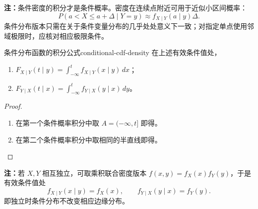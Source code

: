 \textbf{注：}\quad 条件密度的积分才是条件概率。密度在连续点附近可用于近似小区间概率：
\[
P(a<X\leq a+\Delta\mid Y=y)\approx f_{X\mid Y}(a\mid y)\Delta.
\]
条件分布版本只需在关于条件变量分布的几乎处处意义下一致；对指定单点使用邻域极限时，应核对相应极限条件。

\begin{mycorollary}{条件分布函数的积分公式}{conditional-cdf-density}
在上述有效条件值处，
\begin{enumerate}
\item $F_{X\mid Y}(t\mid y)=\displaystyle\int_{-\infty}^t
f_{X\mid Y}(x\mid y)\,dx$；
\item $F_{Y\mid X}(t\mid x)=\displaystyle\int_{-\infty}^t
f_{Y\mid X}(y\mid x)\,dy$。
\end{enumerate}
\end{mycorollary}
\begin{proof}
\begin{enumerate}
\item 在第一个条件概率积分中取 $A=(-\infty,t]$ 即得。
\item 在第二个条件概率积分中取相同的半直线即得。
\end{enumerate}
\end{proof}

\textbf{注：}\quad 若 $X,Y$ 相互独立，可取乘积联合密度版本 $f(x,y)=f_X(x)f_Y(y)$，于是有效条件值处
\[
f_{X\mid Y}(x\mid y)=f_X(x),\qquad
f_{Y\mid X}(y\mid x)=f_Y(y).
\]
即独立时条件分布不改变相应边缘分布。

